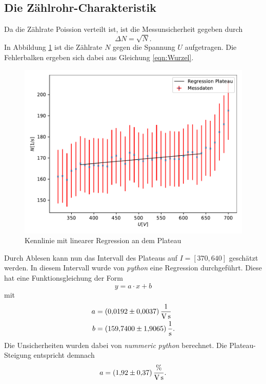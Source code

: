 \subsection{Die Zählrohr-Charakteristik}
Da die Zählrate Poission verteilt ist, ist die Messunsicherheit gegeben durch 
\begin{equation}
    \Delta N=\sqrt{N}. \label{eqn:Wurzel}
\end{equation}
In Abbildung \ref{fig:Kennlinie} ist die Zählrate $N$ gegen die Spannung $U$ aufgetragen. Die Fehlerbalken
ergeben sich dabei aus Gleichung \ref{eqn:Wurzel}.
\begin{figure}[H]
    \centering
    \includegraphics[scale=0.8]{auswertung/plot1.pdf}
    \caption{Kennlinie mit linearer Regression an dem Plateau}
    \label{fig:Kennlinie}
  \end{figure}
  \noindent Durch Ablesen kann nun das Intervall des Plateaus auf $I=[370, 640]$ geschätzt werden. In diesem 
  Intervall wurde von \textit{python} eine Regression durchgeführt. Diese hat eine Funktionsgleichung der Form
  \begin{equation}
      y=a\cdot x+b \label{eqn:gerade}
  \end{equation} 
  mit
  \begin{align*}
    a &= \SI{0.0192 \pm 0.0037}{\per\volt\per\second}\\
    b &= \SI{159.74 \pm 1.9065}{\per\second}.
  \end{align*}
  Die Unsicherheiten wurden dabei von  \textit{nummeric python} berechnet.
  Die Plateau-Steigung entspricht demnach
  \begin{equation*}
    a = \SI{1.92 \pm 0.37}{\percent\per\volt\per\second}.
  \end{equation*}

